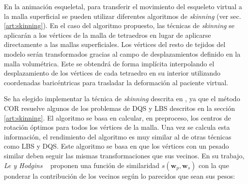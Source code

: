 En la animación esqueletal, para transferir el movimiento del esqueleto virtual a la malla superficial\new{,} se pueden utilizar diferentes algoritmos de \emph{skinning} (ver sec.\ref{art:skinning}). %
En el caso del algoritmo propuesto, las técnicas de  \emph{skinning} se aplicarán a los vértices de la malla de tetraedros en lugar de aplicarse directamente a las mallas superficiales. Los vértices del resto de tejidos del modelo serán transformados gracias al campo de desplazamientos definido en la malla volumétrica. Este se obtendrá de forma implícita interpolando el desplazamiento de los vértices de cada tetraedro en su interior\new{,} utilizando coordenadas baricéntricas para trasladar la deformación al paciente virtual. 



Se ha elegido implementar la técnica de \emph{skinning} descrita en \cite{le2016real},  ya que el método \ac{COR} resuelve algunos de los problemas de \ac{DQS} y \ac{LBS} descritos en la sección \ref{art:skinning}. El algoritmo se basa en calcular, en preproceso, los centros de rotación óptimos para todos los vértices de la malla. %
Una vez se calcula esta información, el rendimiento del algoritmo es muy similar al de otras técnicas como \ac{LBS} y \ac{DQS}. %
Este algoritmo se basa en que los vértices con un pesado similar deben seguir las mismas transformaciones que sus vecinos. En su trabajo, \emph {Le y Hodgins} ~\cite{le2016real} proponen una función de similaridad  $s(\textbf{w}_p,\textbf{w}_s)$ con la que ponderar la contribución de los vecinos según lo parecidos que sean sus pesos:

